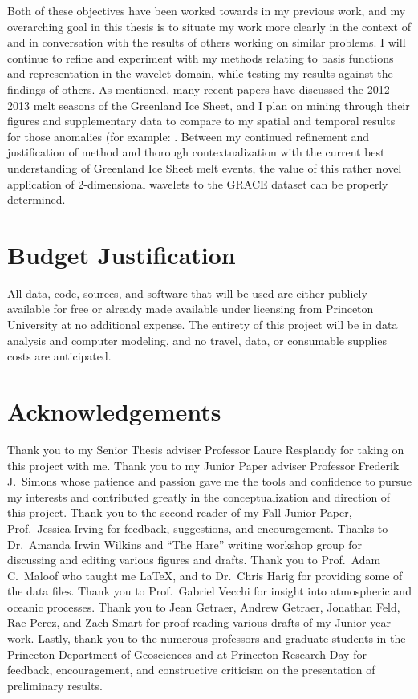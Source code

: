 \documentclass[12pt]{article}
\begin{document}
Both of these objectives have been worked towards in my previous work, and my overarching goal in this thesis is to situate my work more clearly in the context of and in conversation with the results of others working on similar problems. I will continue to refine and experiment with my methods relating to basis functions and representation in the wavelet domain, while testing my results against the findings of others. As mentioned, many recent papers have discussed the 2012--2013 melt seasons of the Greenland Ice Sheet, and I plan on mining through their figures and supplementary data to compare to my spatial and temporal results for those anomalies (for example:  \cite{mattingly2018,solomon2017,mcmillan2016,bevis2018,fausto2016, hanna2014}. Between my continued refinement and justification of method and thorough contextualization with the current best understanding of Greenland Ice Sheet melt events, the value of this rather novel application of 2-dimensional wavelets to the GRACE dataset can be properly determined.

\section{Budget Justification \label{sec:budget}}

All data, code, sources, and software that will be used are either
publicly available for free or already made available under licensing
from Princeton University at no additional expense. The entirety of
this project will be in data analysis and computer modeling, and no
travel, data, or consumable supplies costs are anticipated.
 
\section{Acknowledgements \label{sec:ack}}

Thank you to my Senior Thesis adviser Professor Laure Resplandy for taking on this project with me. Thank you to my Junior Paper adviser Professor Frederik J.~Simons whose patience and passion gave me the tools and confidence to pursue my interests and contributed greatly in the conceptualization and direction of this project. Thank you to the second reader of my Fall Junior Paper, Prof.~Jessica Irving for feedback, suggestions, and encouragement. Thanks to Dr.~Amanda
Irwin Wilkins and ``The Hare'' writing workshop group for discussing
and editing various figures and drafts. Thank you to Prof.~Adam C.~Maloof who taught me \LaTeX, and to Dr.~Chris Harig for providing some of the data files. Thank you to Prof.~Gabriel Vecchi for insight into atmospheric and oceanic processes. Thank you to Jean Getraer, Andrew Getraer, Jonathan Feld, Rae Perez, and Zach Smart for proof-reading various drafts of my Junior year work.  Lastly, thank you to the numerous professors and graduate students in the Princeton Department of Geosciences and at Princeton Research Day for feedback, encouragement, and constructive criticism on the presentation of preliminary results.

\small
\renewcommand{\bibsep}{0em}
\renewcommand{\bibname}{References}


\end{document}

